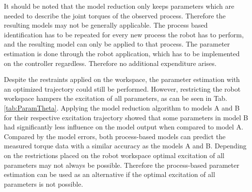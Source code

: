 It should be noted that the model reduction only keeps parameters which are needed to describe the joint torques of the observed process. Therefore the resulting models may not be generally applicable. The process based identification has to be repeated for every new process the robot has to perform, and the resulting model can only be applied to that process. The parameter estimation is done through the robot application, which has to be implemented on the controller regardless. Therefore no additional expenditure arises.

Despite the restraints applied on the workspace, the parameter estimation with an optimized trajectory could still be performed. However, restricting the robot workspace hampers the excitation of all parameters, as can be seen in Tab.\,\ref{tab:ParamTheta}. Applying the model reduction algorithm to models A and B for their respective excitation trajectory showed that some parameters in model B had significantly less influence on the model output when compared to model A. Compared by the model errors, both process-based models can predict the measured torque data with a similar accuracy as the models A and B. Depending on the restrictions placed on the robot workspace optimal excitation of all parameters may not always be possible. Therefore the process-based parameter estimation can be used as an alternative if the optimal excitation of all parameters is not possible.

